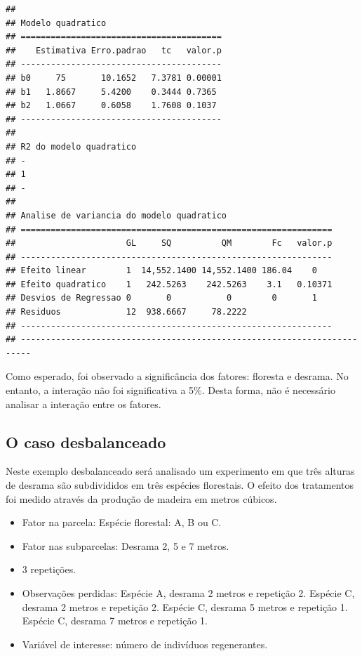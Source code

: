 \documentclass[
]{article}
\providecommand{\tightlist}{%
  \setlength{\itemsep}{0pt}\setlength{\parskip}{0pt}}
\begin{document}
\begin{verbatim}
## 
## Modelo quadratico
## ========================================
##    Estimativa Erro.padrao   tc   valor.p
## ----------------------------------------
## b0     75       10.1652   7.3781 0.00001
## b1   1.8667     5.4200    0.3444 0.7365 
## b2   1.0667     0.6058    1.7608 0.1037 
## ----------------------------------------
## 
## R2 do modelo quadratico
## -
## 1
## -
## 
## Analise de variancia do modelo quadratico
## ==============================================================
##                      GL     SQ          QM        Fc   valor.p
## --------------------------------------------------------------
## Efeito linear        1  14,552.1400 14,552.1400 186.04    0   
## Efeito quadratico    1   242.5263    242.5263    3.1   0.10371
## Desvios de Regressao 0       0           0        0       1   
## Residuos             12  938.6667     78.2222                 
## --------------------------------------------------------------
## ------------------------------------------------------------------------
\end{verbatim}

Como esperado, foi observado a significância dos fatores: floresta e desrama. No entanto, a interação não foi significativa a 5\%. Desta forma, não é necessário analisar a interação entre os fatores.

\hypertarget{o-caso-desbalanceado-4}{%
\subsection{O caso desbalanceado}\label{o-caso-desbalanceado-4}}

Neste exemplo desbalanceado será analisado um experimento em que três alturas de desrama são subdivididos em três espécies florestais. O efeito dos tratamentos foi medido através da produção de madeira em metros cúbicos.

\begin{itemize}
\tightlist
\item
  Fator na parcela: Espécie florestal: A, B ou C.
\item
  Fator nas subparcelas: Desrama 2, 5 e 7 metros.
\item
  3 repetições.
\item
  Observações perdidas: Espécie A, desrama 2 metros e repetição 2. Espécie C, desrama 2 metros e repetição 2. Espécie C, desrama 5 metros e repetição 1. Espécie C, desrama 7 metros e repetição 1.
\item
  Variável de interesse: número de indivíduos regenerantes.
\end{itemize}
\end{document}
